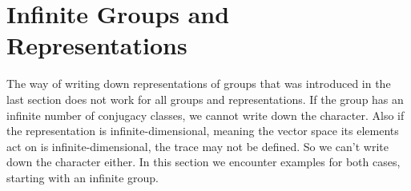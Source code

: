 \section{Infinite Groups and Representations}

The way of writing down representations of groups that was introduced in the last section does not work for all groups and representations.
If the group has an infinite number of conjugacy classes, we cannot write down the character.
Also if the representation is infinite-dimensional, meaning the vector space its elements act on is infinite-dimensional, the trace may not be defined.
So we can't write down the character either.
In this section we encounter examples for both cases, starting with an infinite group.



